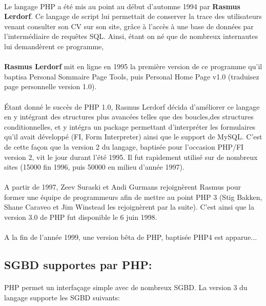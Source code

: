 \paragraph{}
Le langage PHP a été mis au point au début d'automne 1994 par \textbf{Rasmus Lerdorf}. Ce langage de script lui permettait de conserver la trace des utilisateurs venant consulter son CV sur son site, grâce à l'accès à une base de données par l'intermédiaire de requêtes SQL. Ainsi, étant on né que de nombreux internautes lui demandèrent ce programme,
\paragraph{}
 \textbf{Rasmus Lerdorf} mit en ligne en 1995 la première version de ce programme qu'il baptisa Personal Sommaire Page Tools, puis Personal Home Page v1.0 (traduisez page personnelle version 1.0).
\paragraph{}
Étant donné le succès de PHP 1.0, Rasmus Lerdorf décida d'améliorer ce
langage en y intégrant des structures plus avancées telles que des boucles,des structures conditionnelles, et y intégra un package permettant
d'interpréter les formulaires qu'il avait développé (FI, Form Interpreter)
ainsi que le support de MySQL. C'est de cette façon que la version 2 du langage, baptisée pour l'occasion PHP/FI version 2, vit le jour durant l'été 1995. Il fut rapidement utilisé sur de nombreux sites (15000 fin 1996, puis 50000 en milieu d'année 1997).
\paragraph{}
A partir de 1997, Zeev Suraski et Andi Gurmans rejoignèrent Rasmus pour
former une équipe de programmeurs afin de mettre au point PHP 3
(Stig Bakken, Shane Caraveo et Jim Winstead les rejoignèrent par la suite). C'est ainsi que la version 3.0 de PHP fut disponible le 6 juin 1998.
\paragraph{}
A la fin de l'année 1999, une version bêta de PHP, baptisée PHP4 est
apparue...
\subsection{SGBD supportes par PHP:}
\paragraph{}
PHP permet un interfaçage simple avec de nombreux SGBD. La
version 3 du langage supporte les SGBD suivants:
